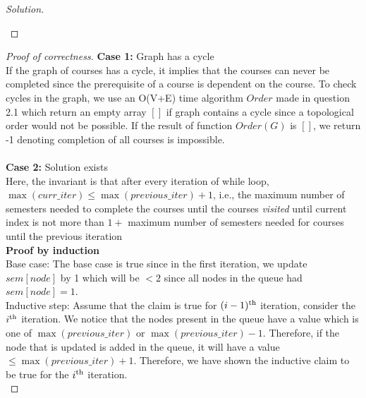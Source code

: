\begin{solution}{2.2}
\begin{proof}[Solution]
\begin{algorithm}[H]
\begin{algorithmic}
             
                     
                \EndIf{}
            \EndFor{}
        \EndWhile{}
        \EndProcedure
        \end{algorithmic}
        \end{algorithm}
    \end{proof}
    \begin{proof}[Proof of correctness]
        \textbf{Case 1:} Graph has a cycle\\
        If the graph of courses has a cycle, it implies that the courses can never be completed since the prerequisite of a course is dependent on the course. To check cycles in the graph, we use an O(V+E) time algorithm $Order$ made in question 2.1 which return an empty array $[]$ if graph contains a cycle since a topological order would not be possible. If the result of function $Order(G)$ is $[]$, we return -1 denoting completion of all courses is impossible.\\
        \\
        \textbf{Case 2:} Solution exists\\
        Here, the invariant is that after every iteration of while loop, $\max(curr\_iter)\leq \max(previous\_iter) + 1$, i.e., the maximum number of semesters needed to complete the courses until the courses \textit{visited} until current index is not more than $1+$ maximum number of semesters needed for courses until the previous iteration\\
        \textbf{Proof by induction}\\
        Base case: The base case is true since in the first iteration, we update $sem[node]$ by 1 which will be $<2$ since all nodes in the queue had $sem[node]=1$.\\
        Inductive step: Assume that the claim is true for $(i-1)\textsuperscript{th}$ iteration, consider the $i\textsuperscript{th}$ iteration. We notice that the nodes present in the queue have a value which is one of $\max(previous\_iter)$ or $\max(previous\_iter)-1$. Therefore, if the node that is updated is added in the queue, it will have a value $\leq\max(previous\_iter)+1$. Therefore, we have shown the inductive claim to be true for the $i\textsuperscript{th}$ iteration.\\

\end{proof}
\end{solution}
